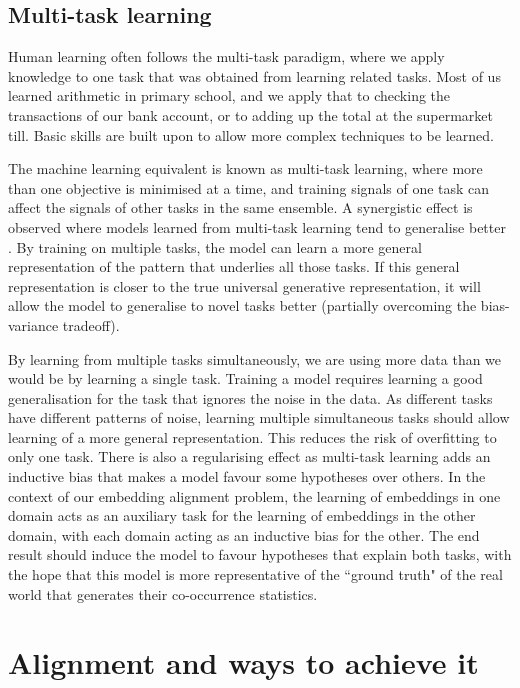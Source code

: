 \subsection{Multi-task learning}

Human learning often follows the multi-task paradigm, where we apply knowledge to one task that was obtained from learning related tasks. Most of us learned arithmetic in primary school, and we apply that to checking the transactions of our bank account, or to adding up the total at the supermarket till. Basic skills are built upon to allow more complex techniques to be learned. 

The machine learning equivalent is known as multi-task learning, where more than one objective is minimised at a time, and training signals of one task can affect the signals of other tasks in the same ensemble. A synergistic effect is observed where models learned from multi-task learning tend to generalise better \cite{OverviewMultiTaskLearning}. By training on multiple tasks, the model can learn a more general representation of the pattern that underlies all those tasks. If this general representation is closer to the true universal generative representation, it will allow the model to generalise to novel tasks better (partially overcoming the bias-variance tradeoff). %

By learning from multiple tasks simultaneously, we are using more data than we would be by learning a single task. Training a model requires learning a good generalisation for the task that ignores the noise in the data. As different tasks have different patterns of noise, learning multiple simultaneous tasks should allow learning of a more general representation. This reduces the risk of overfitting to only one task. There is also a regularising effect as multi-task learning adds an inductive bias that makes a model favour some hypotheses over others. In the context of our embedding alignment problem, the learning of embeddings in one domain acts as an auxiliary task for the learning of embeddings in the other domain, with each domain acting as an inductive bias for the other. The end result should induce the model to favour hypotheses that explain both tasks, with the hope that this model is more representative of the ``ground truth" of the real world that generates their co-occurrence statistics.  

\section{Alignment and ways to achieve it}
    
